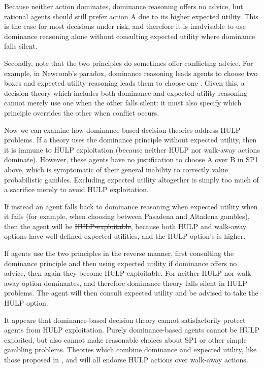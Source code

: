 \documentclass{article}
\providecommand{\DIFadd}[1]{{\protect\color{blue}\uwave{#1}}} %
\providecommand{\DIFdel}[1]{{\protect\color{red}\sout{#1}}}                      %
\providecommand{\DIFaddbegin}{} %
\providecommand{\DIFaddend}{} %
\providecommand{\DIFdelbegin}{} %
\providecommand{\DIFdelend}{} %
\begin{document}
Because neither action dominates, dominance reasoning offers no advice, but rational agents should still prefer action A due to its higher expected utility. This is the case for most decisions under risk, and therefore it is inadvisable to use dominance reasoning alone without consulting expected utility where dominance falls silent.

Secondly, note that the two principles do sometimes offer conflicting advice. For example, in Newcomb's paradox, dominance reasoning leads agents to choose two boxes and expected utility reasoning leads them to choose one \citep[pg. 110]{resnik1987choices}. Given this, a decision theory which includes both dominance and expected utility reasoning cannot merely use one when the other falls silent: it must also specify which principle overrides the other when conflict occurs.

Now we can examine how dominance-based decision theories address HULP problems. If a theory uses the dominance principle without expected utility, then it is immune to HULP exploitation (because neither HULP nor walk-away actions dominate). However, these agents have no justification to choose A over B in SP1 above, which is symptomatic of their general inability to correctly value probabilistic gambles. Excluding expected utility altogether is simply too much of a sacrifice merely to avoid HULP exploitation.

If instead an agent falls back to dominance reasoning when expected utility when it fails (for example, when choosing between Pasadena and Altadena gambles), then the agent will be \DIFdelbegin \DIFdel{HULP-exploitable}\DIFdelend \DIFaddbegin \DIFadd{HULP exploitable}\DIFaddend , because both HULP and walk-away options have well-defined expected utilities, and the HULP option's is higher.

If agents use the two principles in the reverse manner, first consulting the dominance principle and then using expected utility if dominance offers no advice, then again they become \DIFdelbegin \DIFdel{HULP-exploitable}\DIFdelend \DIFaddbegin \DIFadd{HULP exploitable}\DIFaddend . For neither HULP nor walk-away option dominantes, and therefore dominance theory falls silent in HULP problems. The agent will then consult expected utility and be advised to take the HULP option.

It appears that dominance-based decision theory cannot satisfactorily protect agents from HULP exploitation. Purely dominance-based agents cannot be HULP exploited, but also cannot make reasonable choices about SP1 or other simple gambling problems. Theories which combine dominance and expected utility, like those proposed in \citep{colyvan2008relative}, \citep{colyvan2006no} and \citep{easwaran2009dominance} will all endorse HULP actions over walk-away actions. 
\end{document}

